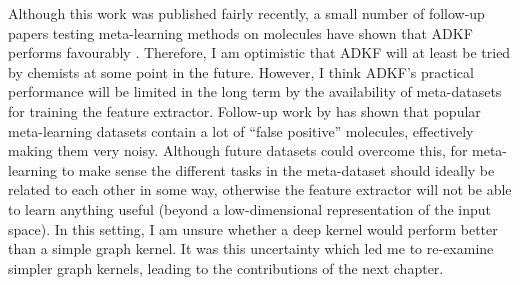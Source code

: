 Although this work was published fairly recently,
a small number of follow-up papers testing meta-learning methods on molecules
have shown that ADKF performs favourably
\citep{
    ortegon2024graph,  %
    schimunek2023contextenriched%
}.
Therefore, I am optimistic that ADKF will at least be tried by chemists at some point in the future.
However, I think ADKF's practical performance will be limited in the long term
by the availability of meta-datasets for training the feature extractor.
Follow-up work by \citet{klarner2022bias} has shown that popular meta-learning datasets
contain a lot of ``false positive'' molecules, effectively making them very noisy.
Although future datasets could overcome this, for meta-learning to make sense the different tasks
in the meta-dataset should ideally be related to each other in some way,
otherwise the feature extractor will not be able to learn anything useful
(beyond a low-dimensional representation of the input space).
In this setting, I am unsure whether a deep kernel would perform better than a simple graph kernel.
It was this uncertainty which led me to re-examine simpler graph kernels,
leading to the contributions of the next chapter.
